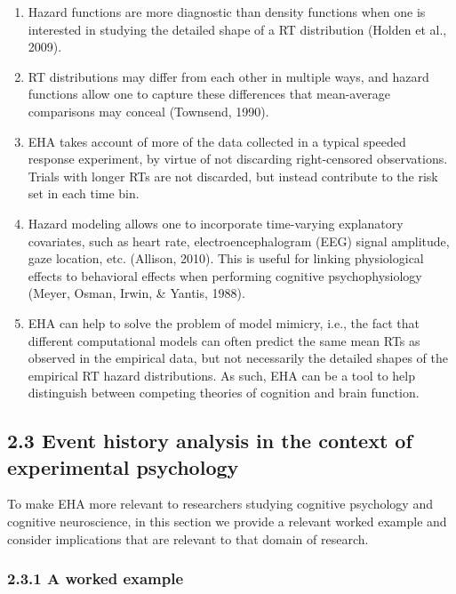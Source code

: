 \documentclass[
  man, donotrepeattitle,floatsintext]{apa6}
\begin{document}
\begin{enumerate}
\def\labelenumi{\arabic{enumi}.}
\item
  Hazard functions are more diagnostic than density functions when one is interested in studying the detailed shape of a RT distribution (Holden et al., 2009).
\item
  RT distributions may differ from each other in multiple ways, and hazard functions allow one to capture these differences that mean-average comparisons may conceal (Townsend, 1990).
\item
  EHA takes account of more of the data collected in a typical speeded response experiment, by virtue of not discarding right-censored observations. Trials with longer RTs are not discarded, but instead contribute to the risk set in each time bin.
\item
  Hazard modeling allows one to incorporate time-varying explanatory covariates, such as heart rate, electroencephalogram (EEG) signal amplitude, gaze location, etc. (Allison, 2010). This is useful for linking physiological effects to behavioral effects when performing cognitive psychophysiology (Meyer, Osman, Irwin, \& Yantis, 1988).
\item
  EHA can help to solve the problem of model mimicry, i.e., the fact that different computational models can often predict the same mean RTs as observed in the empirical data, but not necessarily the detailed shapes of the empirical RT hazard distributions. As such, EHA can be a tool to help distinguish between competing theories of cognition and brain function.
\end{enumerate}

\subsection{2.3 Event history analysis in the context of experimental psychology}\label{event-history-analysis-in-the-context-of-experimental-psychology}

To make EHA more relevant to researchers studying cognitive psychology and cognitive neuroscience, in this section we provide a relevant worked example and consider implications that are relevant to that domain of research.

\subsubsection{2.3.1 A worked example}\label{a-worked-example}
\end{document}
